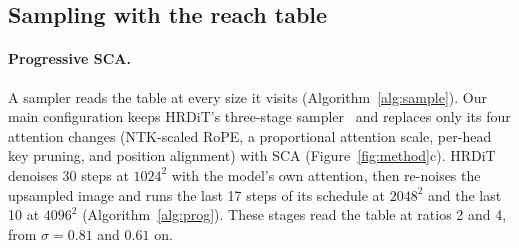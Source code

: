 \documentclass{article} %
\newcommand{\nmain}{195}  %
\newcommand{\fullonly}[1]{\ifshortversion\else#1\fi}
\providecommand{\pendTabMain}{}\providecommand{\pendTabPanel}{}\providecommand{\pendTabAbl}{}\providecommand{\pendTabGen}{}
\newcommand{\sca}{SCA}
\theoremstyle{remark}
\begin{document}
\subsection{Sampling with the reach table}
\label{sec:sched}\label{sec:progressive}

\paragraph{Progressive \sca{}.} A sampler reads the table at every size it visits (Algorithm~\ref{alg:sample}). Our main configuration keeps HRDiT's three-stage sampler~\citep{xue2026hrdit} and replaces only its four attention changes (NTK-scaled RoPE, a proportional attention scale, per-head key pruning, and position alignment) with \sca{} (Figure~\ref{fig:method}c). HRDiT denoises 30 steps at $1024^2$ with the model's own attention, then re-noises the upsampled image and runs the last 17 steps of its schedule at $2048^2$ and the last 10 at $4096^2$\fullonly{ (Algorithm~\ref{alg:prog})}. These stages read the table at ratios 2 and 4, from $\sigma=0.81$ and $0.61$ on.

\begin{table}[t]
  \caption{\textbf{Main comparison at $4096^2$.} FLUX.1-dev, \nmain{} Aesthetic-4K prompts, seed 0; HPSv2.1 $\times100$; M$_\text{c}$: MUSIQ on $1024^2$ crops; FID$_\text{p}$: patch FID$^\dagger$. Time: clean batch-1 median on one GH200 ($^\ddagger$campaign mean) and its ratio to progressive \sca{}'s of the same kind. $+/-$: of the ten per-image metrics, those where progressive \sca{} is significantly better\,/\,worse than the row (Holm). Bold: best, underline: second per group; shaded: ours. Key result: progressive \sca{} is fastest, and no baseline is significantly better on any per-image metric.\pendTabMain{}}
  \label{tab:main}
  \centering\small
  
\end{table}
\end{document}

